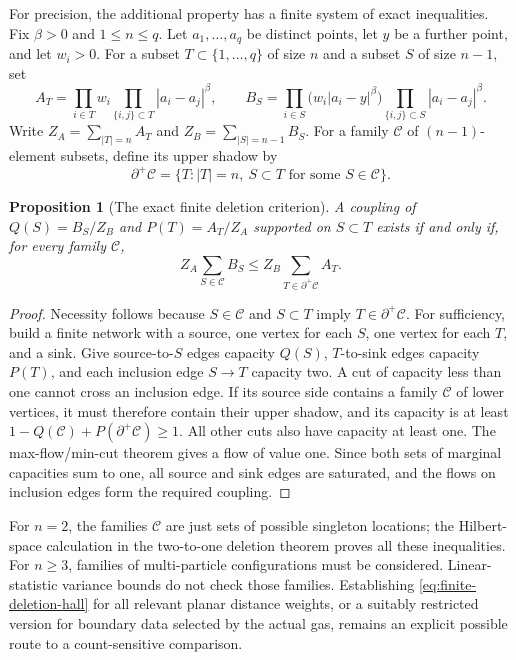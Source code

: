 \documentclass[11pt]{article}
\newtheorem{proposition}[theorem]{Proposition}
\theoremstyle{remark}\newtheorem{remark}[theorem]{Remark}
\begin{document}
For precision, the additional property has a finite system of exact
inequalities. Fix $\beta>0$ and $1\le n\le q$.
Let $a_1,\ldots,a_q$ be distinct points, let $y$ be a
further point, and let $w_i>0$.  For a subset $T\subset\{1,\ldots,q\}$
of size $n$ and a subset $S$ of size $n-1$, set
\[
 A_T=\prod_{i\in T}w_i
       \prod_{\{i,j\}\subset T}|a_i-a_j|^\beta,
 \qquad
 B_S=\prod_{i\in S}\bigl(w_i|a_i-y|^\beta\bigr)
       \prod_{\{i,j\}\subset S}|a_i-a_j|^\beta.
\]
Write $Z_A=\sum_{|T|=n}A_T$ and $Z_B=\sum_{|S|=n-1}B_S$.
For a family $\mathcal C$ of $(n-1)$-element subsets, define its upper
shadow by
\[
 \partial^+\mathcal C
 =\{T:|T|=n,\ S\subset T\text{ for some }S\in\mathcal C\}.
\]

\begin{proposition}[The exact finite deletion criterion]
\label{prop:finite-deletion-hall}
A coupling of $Q(S)=B_S/Z_B$ and $P(T)=A_T/Z_A$ supported on $S\subset T$
exists if and only if, for every family $\mathcal C$,
\begin{equation}
 Z_A\sum_{S\in\mathcal C}B_S
 \le Z_B\sum_{T\in\partial^+\mathcal C}A_T.
 \label{eq:finite-deletion-hall}
\end{equation}
\end{proposition}

\begin{proof}
Necessity follows because $S\in\mathcal C$ and $S\subset T$ imply
$T\in\partial^+\mathcal C$.  For sufficiency, build a finite network
with a source, one vertex for each $S$, one vertex for each $T$, and a
sink.  Give source-to-$S$ edges capacity $Q(S)$, $T$-to-sink edges
capacity $P(T)$, and each inclusion edge $S\to T$ capacity two.
A cut of capacity less than one cannot cross an inclusion edge.
If its source side contains a family $\mathcal C$ of lower vertices,
it must therefore contain their upper shadow, and its capacity is at
least $1-Q(\mathcal C)+P(\partial^+\mathcal C)\ge1$.
All other cuts also have capacity at least one.  The max-flow/min-cut
theorem gives a flow of value one.  Since both sets of marginal
capacities sum to one, all source and sink edges are saturated, and
the flows on inclusion edges form the required coupling.
\end{proof}

For $n=2$, the families $\mathcal C$ are just sets of possible singleton
locations; the Hilbert-space calculation in the two-to-one deletion
theorem proves all these inequalities.  For $n\ge3$, families of
multi-particle configurations must be considered.  Linear-statistic
variance bounds do not check those families.  Establishing
\eqref{eq:finite-deletion-hall} for all relevant planar distance weights,
or a suitably restricted version for boundary data selected by the
actual gas, remains an explicit possible route to a count-sensitive
comparison.
\end{document}
